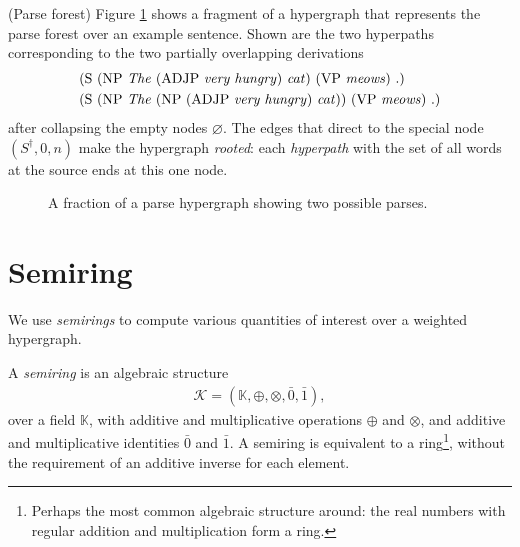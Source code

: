   \begin{example}{(Parse forest)}
    Figure \ref{fig:hypergraph} shows a fragment of a hypergraph that represents the parse forest over an example sentence. Shown are the two hyperpaths corresponding to the two partially overlapping derivations
    \begin{align}
      &\text{(S (NP \textit{The} (ADJP \textit{very hungry}) \textit{cat}) (VP \textit{meows}) .)}  \\
      &\text{(S (NP \textit{The} (NP (ADJP \textit{very hungry}) \textit{cat})) (VP \textit{meows}) .)}
    \end{align}
    after collapsing the empty nodes $\varnothing$. The edges that direct to the special node $(S^{\dagger}, 0, n)$ make the hypergraph \textit{rooted}: each \textit{hyperpath} with the set of all words at the source ends at this one node.
    \begin{figure}[h]
      \center
      \begin{tikzpicture}[scale=.6]
        
      \end{tikzpicture}
      \caption{A fraction of a parse hypergraph showing two possible parses.}
      \label{fig:hypergraph}
    \end{figure}
  \end{example}

\section{Semiring}
  We use \textit{semirings} to compute various quantities of interest over a weighted hypergraph.

  \begin{definition}{}
    A \textit{semiring} is an algebraic structure
    \begin{align*}
      \mathcal{K} = ( \mathbb{K}, \oplus, \otimes, \bar{0}, \bar{1} ),
    \end{align*}
    over a field $\mathbb{K}$, with additive and multiplicative operations $\oplus$ and $\otimes$, and additive and multiplicative identities $\bar{0}$ and $\bar{1}$. A semiring is equivalent to a ring\footnote{Perhaps the most common algebraic structure around: the real numbers with regular addition and multiplication form a ring.}, without the requirement of an additive inverse for each element.
  \end{definition}

